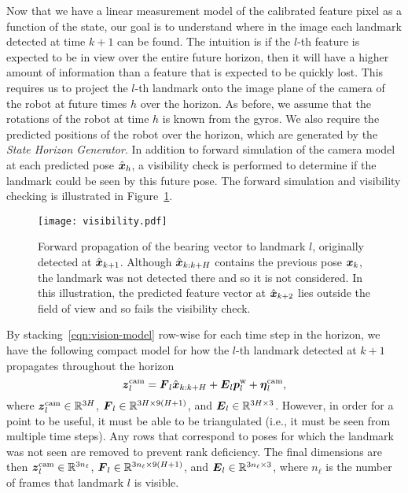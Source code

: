 Now that we have a linear measurement model of the calibrated feature pixel as a function of the state, our goal is to understand where in the image each landmark detected at time $k+1$ can be found.
The intuition is if the $l$-th feature is expected to be in view over the entire future horizon, then it will have a higher amount of information than a feature that is expected to be quickly lost.
This requires us to project the $l$-th landmark onto the image plane of the camera of the robot at future times $h$ over the horizon.
As before, we assume that the rotations of the robot at time $h$ is known from the gyros.
We also require the predicted positions of the robot over the horizon, which are generated by the \emph{State Horizon Generator}.
In addition to forward simulation of the camera model at each predicted pose $\hat{\boldsymbol x}_h$, a visibility check is performed to determine if the landmark could be seen by this future pose.
The forward simulation and visibility checking is illustrated in Figure~\ref{fig:visibility}.

\begin{figure}
\centering
\texttt{[image: visibility.pdf]} 
\caption{Forward propagation of the bearing vector to landmark $l$, originally detected at $\hat{\boldsymbol x}_{k+1}$. Although $\hat{\boldsymbol x}_{k:k+H}$ contains the previous pose $\boldsymbol x_k$, the landmark was not detected there and so it is not considered. In this illustration, the predicted feature vector at $\hat{\boldsymbol x}_{k+2}$ lies outside the field of view and so fails the visibility check.}
\label{fig:visibility}
\end{figure}

By stacking~\eqref{eqn:vision-model} row-wise for each time step in the horizon, we have the following compact model for how the $l$-th landmark detected at $k+1$ propagates throughout the horizon
\begin{equation}\label{eqn:vision-model-stacked}
\boldsymbol z_l^\text{cam} = \boldsymbol F_l\hat{\boldsymbol x}_{k:k+H} + \boldsymbol E_l\boldsymbol p^\text{w}_l + \boldsymbol \eta_l^\text{cam},
\end{equation}
where $\boldsymbol z_l^\text{cam}\in\mathbb{R}^{3H}$, $\boldsymbol F_l\in\mathbb{R}^{3H\times 9(H+1)}$, and $\boldsymbol E_l\in\mathbb{R}^{3H\times 3}$.
However, in order for a point to be useful, it must be able to be triangulated (i.e., it must be seen from multiple time steps).
Any rows that correspond to poses for which the landmark was not seen are removed to prevent rank deficiency.
The final dimensions are then $\boldsymbol z_l^\text{cam}\in\mathbb{R}^{3n_\ell}$, $\boldsymbol F_l\in\mathbb{R}^{3n_\ell\times 9(H+1)}$, and $\boldsymbol E_l\in\mathbb{R}^{3n_\ell\times 3}$, where $n_\ell$ is the number of frames that landmark $l$ is visible.

